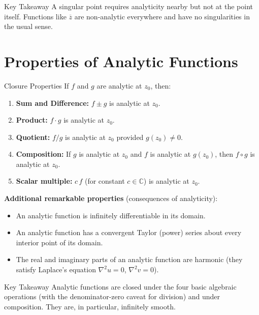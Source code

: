 \documentclass[12pt,a4paper]{article}
\begin{document}
\begin{learnbox}{Key Takeaway}
A singular point requires analyticity nearby but not at the point itself. Functions like $\overline{z}$ are non-analytic everywhere and have no singularities in the usual sense.
\end{learnbox}

\section{Properties of Analytic Functions}

\begin{infobox}{Closure Properties}
If $f$ and $g$ are analytic at $z_0$, then:

\begin{enumerate}
  \item \textbf{Sum and Difference:} $f \pm g$ is analytic at $z_0$.
  \item \textbf{Product:} $f \cdot g$ is analytic at $z_0$.
  \item \textbf{Quotient:} $f/g$ is analytic at $z_0$ provided $g(z_0) \neq 0$.
  \item \textbf{Composition:} If $g$ is analytic at $z_0$ and $f$ is analytic
        at $g(z_0)$, then $f \circ g$ is analytic at $z_0$.
  \item \textbf{Scalar multiple:} $c\,f$ (for constant $c \in \mathbb{C}$) is
        analytic at $z_0$.
\end{enumerate}

\textbf{Additional remarkable properties} (consequences of analyticity):
\begin{itemize}
  \item An analytic function is infinitely differentiable in its domain.
  \item An analytic function has a convergent Taylor (power) series about every
        interior point of its domain.
  \item The real and imaginary parts of an analytic function are harmonic
        (they satisfy Laplace's equation $\nabla^{2} u = 0$, $\nabla^{2} v = 0$).
\end{itemize}
\end{infobox}

\begin{learnbox}{Key Takeaway}
Analytic functions are closed under the four basic algebraic operations (with the denominator-zero caveat for division) and under composition. They are, in particular, infinitely smooth.
\end{learnbox}
\end{document}
